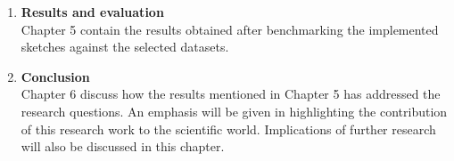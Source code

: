 \begin{enumerate}
    \item \textbf{Results and evaluation}\\
          Chapter 5 contain the results obtained after benchmarking the implemented sketches against the selected datasets.

    \item \textbf{Conclusion}\\
          Chapter 6 discuss how the results mentioned in Chapter 5 has addressed the research questions. An emphasis will be given in highlighting the contribution of this research work to the scientific world. Implications of further research will also be discussed in this chapter.
\end{enumerate}